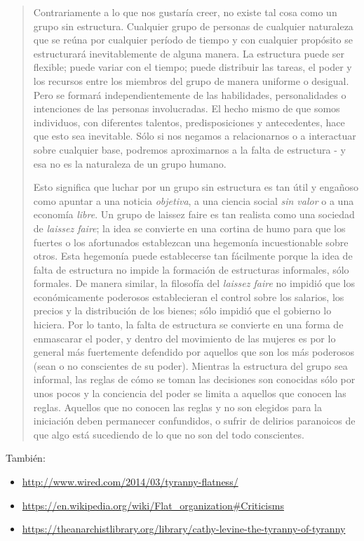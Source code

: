 \begin{quotation}
	Contrariamente a lo que nos gustaría creer, no existe tal cosa como un grupo sin estructura. Cualquier grupo de personas de cualquier naturaleza que se reúna por cualquier período de tiempo y con cualquier propósito se estructurará inevitablemente de alguna manera. La estructura puede ser flexible; puede variar con el tiempo; puede distribuir las tareas, el poder y los recursos entre los miembros del grupo de manera uniforme o desigual. Pero se formará independientemente de las habilidades, personalidades o intenciones de las personas involucradas. El hecho mismo de que somos individuos, con diferentes talentos, predisposiciones y antecedentes, hace que esto sea inevitable. Sólo si nos negamos a relacionarnos o a interactuar sobre cualquier base, podremos aproximarnos a la falta de estructura - y esa no es la naturaleza de un grupo humano.

	Esto significa que luchar por un grupo sin estructura es tan útil y engañoso como apuntar a una noticia \emph{objetiva}, a una ciencia social \emph{sin valor} o a una economía \emph{libre}. Un grupo de laissez faire es tan realista como una sociedad de \emph{laissez faire}; la idea se convierte en una cortina de humo para que los fuertes o los afortunados establezcan una hegemonía incuestionable sobre otros. Esta hegemonía puede establecerse tan fácilmente porque la idea de falta de estructura no impide la formación de estructuras informales, sólo formales. De manera similar, la filosofía del \emph{laissez faire} no impidió que los económicamente poderosos establecieran el control sobre los salarios, los precios y la distribución de los bienes; sólo impidió que el gobierno lo hiciera. Por lo tanto, la falta de estructura se convierte en una forma de enmascarar el poder, y dentro del movimiento de las mujeres es por lo general más fuertemente defendido por aquellos que son los más poderosos (sean o no conscientes de su poder). Mientras la estructura del grupo sea informal, las reglas de cómo se toman las decisiones son conocidas sólo por unos pocos y la conciencia del poder se limita a aquellos que conocen las reglas. Aquellos que no conocen las reglas y no son elegidos para la iniciación deben permanecer confundidos, o sufrir de delirios paranoicos de que algo está sucediendo de lo que no son del todo conscientes.
\end{quotation}

También:

\begin{itemize}
\item \url{http://www.wired.com/2014/03/tyranny-flatness/}
\item \url{https://en.wikipedia.org/wiki/Flat\_organization\#Criticisms}
\item \url{https://theanarchistlibrary.org/library/cathy-levine-the-tyranny-of-tyranny}
\end{itemize}

